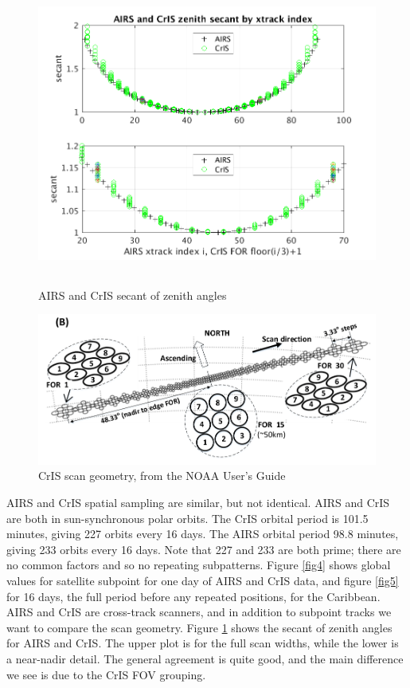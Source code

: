 \documentclass[11pt]{article}
\begin{document}
\begin{figure} %
  \centering
  \includegraphics[height=10cm]{figures/AIRS_CrIS_secant_by_xtrack.png}
  \caption{AIRS and CrIS secant of zenith angles}
  \label{fig6}
\end{figure}

\begin{figure} %
  \centering
  \includegraphics[width=0.9\linewidth]{figures/cris_for_2.png}
  \caption{CrIS scan geometry, from the NOAA User's Guide \cite{ntech1}}
  \label{fig7}
\end{figure}

AIRS and CrIS spatial sampling are similar, but not identical.
AIRS and CrIS are both in sun-synchronous polar orbits.  The CrIS
orbital period is 101.5 minutes, giving 227 orbits every 16 days.
The AIRS orbital period 98.8 minutes, giving 233 orbits every 16
days.  Note that 227 and 233 are both prime; there are no common
factors and so no repeating subpatterns.  Figure \ref{fig4} shows
global values for satellite subpoint for one day of AIRS and CrIS
data, and figure \ref{fig5} for 16 days, the full period before any
repeated positions, for the Caribbean.  AIRS and CrIS are
cross-track scanners, and in addition to subpoint tracks we want to
compare the scan geometry.  Figure \ref{fig6} shows the secant of
zenith angles for AIRS and CrIS.  The upper plot is for the full
scan widths, while the lower is a near-nadir detail.  The general
agreement is quite good, and the main difference we see is due to
the CrIS FOV grouping.
\end{document}
